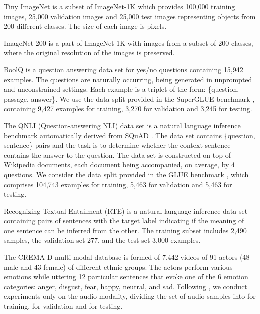 \documentclass[10pt,twocolumn,letterpaper]{article}
\begin{document}
Tiny ImageNet is a subset of ImageNet-1K \cite{Russakovsky-IJCV-2015} which provides 100,000 training images, 25,000 validation images and 25,000 test images representing objects from 200 different classes. The size of each image is  pixels.

ImageNet-200 is a part of ImageNet-1K \cite{Russakovsky-IJCV-2015} with images from a subset of 200 classes, where the original resolution of the images is preserved.

BoolQ \cite{Clark-NAACL-2019} is a question answering data set for yes/no questions containing 15,942 examples. The questions are naturally occurring, being generated in unprompted and unconstrained settings. Each example is a triplet of the form: \{question, passage, answer\}. We use the data split provided in the SuperGLUE benchmark \cite{Wang-NIPS-2019}, containing 9,427 examples for training, 3,270 for validation and 3,245 for testing.

The QNLI (Question-answering NLI) data set \cite{Wang-ICLR-2019} is a natural language inference benchmark automatically derived from SQuAD \cite{Rajpurkar-EMNLP-2016}. The data set contains \{question, sentence\} pairs and the task is to determine whether the context sentence contains the answer to the question. The data set is constructed on top of Wikipedia documents, each document being accompanied, on average, by 4 questions. We consider the data split provided in the GLUE benchmark \cite{Wang-ICLR-2019}, which comprises 104,743 examples for training, 5,463 for validation and 5,463 for testing.

Recognizing Textual Entailment (RTE) \cite{Wang-ICLR-2019} is a natural language inference data set containing pairs of sentences with the target label indicating if the meaning of one sentence can be inferred from the other. The training subset includes 2,490 samples, the validation set 277, and the test set 3,000 examples.

The CREMA-D multi-modal database \cite{Cao-TAC-2014} is formed of 7,442 videos of 91 actors (48 male and 43 female) of different ethnic groups. The actors perform various emotions while uttering 12 particular sentences that evoke one of the 6 emotion categories: anger, disgust, fear, happy, neutral, and sad. Following \cite{Ristea-INTERSPEECH-2021}, we conduct experiments only on the audio modality, dividing the set of audio samples into  for training,  for validation and  for testing.
\end{document}
